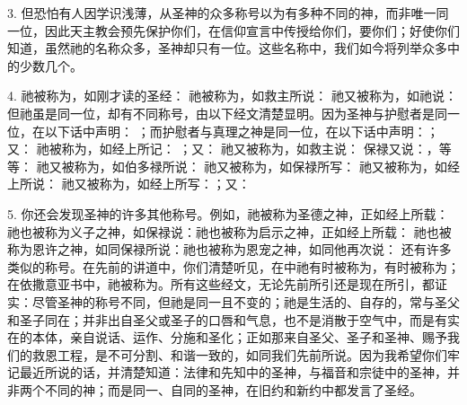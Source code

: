 3. 但恐怕有人因学识浅薄，从圣神的众多称号以为有多种不同的神，而非唯一同一位，因此天主教会预先保护你们，在信仰宣言中传授给你们，要你们；好使你们知道，虽然祂的名称众多，圣神却只有一位。这些名称中，我们如今将列举众多中的少数几个。\par

4. 祂被称为，如刚才读的圣经：  祂被称为，如救主所说：  祂又被称为，如祂说： 但祂虽是同一位，却有不同称号，由以下经文清楚显明。因为圣神与护慰者是同一位，在以下话中声明： ；而护慰者与真理之神是同一位，在以下话中声明：；又： 祂被称为，如经上所记： ；又：  祂又被称为，如救主说：  保禄又说：，等等：  祂又被称为，如伯多禄所说：  祂又被称为，如保禄所写：  祂又被称为，如经上所说：  祂又被称为，如经上所写：；又： \par

5. 你还会发现圣神的许多其他称号。例如，祂被称为圣德之神，正如经上所载： 祂也被称为义子之神，如保禄说：祂也被称为启示之神，正如经上所载： 祂也被称为恩许之神，如同保禄所说：祂也被称为恩宠之神，如同他再次说： 还有许多类似的称号。在先前的讲道中，你们清楚听见，在中祂有时被称为，有时被称为；在依撒意亚书中，祂被称为。所有这些经文，无论先前所引还是现在所引，都证实：尽管圣神的称号不同，但祂是同一且不变的；祂是生活的、自存的，常与圣父和圣子同在；并非出自圣父或圣子的口唇和气息，也不是消散于空气中，而是有实在的本体，亲自说话、运作、分施和圣化；正如那来自圣父、圣子和圣神、赐予我们的救恩工程，是不可分割、和谐一致的，如同我们先前所说。因为我希望你们牢记最近所说的话，并清楚知道：法律和先知中的圣神，与福音和宗徒中的圣神，并非两个不同的神；而是同一、自同的圣神，在旧约和新约中都发言了圣经。\par

